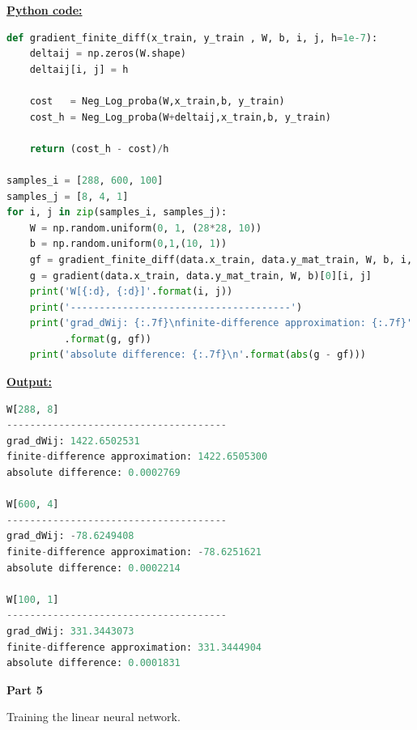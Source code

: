 \documentclass{article}
\begin{document}
\noindent \underline{\textbf{Python code:}} \\
\begin{biomathy}
\begin{lstlisting}[language=python ]
def gradient_finite_diff(x_train, y_train , W, b, i, j, h=1e-7):
    deltaij = np.zeros(W.shape)
    deltaij[i, j] = h

    cost   = Neg_Log_proba(W,x_train,b, y_train)
    cost_h = Neg_Log_proba(W+deltaij,x_train,b, y_train)

    return (cost_h - cost)/h

samples_i = [288, 600, 100]
samples_j = [8, 4, 1]
for i, j in zip(samples_i, samples_j):
    W = np.random.uniform(0, 1, (28*28, 10))
    b = np.random.uniform(0,1,(10, 1))
    gf = gradient_finite_diff(data.x_train, data.y_mat_train, W, b, i, j)
    g = gradient(data.x_train, data.y_mat_train, W, b)[0][i, j]
    print('W[{:d}, {:d}]'.format(i, j))
    print('--------------------------------------')
    print('grad_dWij: {:.7f}\nfinite-difference approximation: {:.7f}'
          .format(g, gf))
    print('absolute difference: {:.7f}\n'.format(abs(g - gf)))
\end{lstlisting}
\end{biomathy}
\pagebreak
\noindent \underline{\textbf{Output:}} \\


\begin{biomathc}
\begin{lstlisting}[language=python]
W[288, 8]
--------------------------------------
grad_dWij: 1422.6502531
finite-difference approximation: 1422.6505300
absolute difference: 0.0002769

W[600, 4]
--------------------------------------
grad_dWij: -78.6249408
finite-difference approximation: -78.6251621
absolute difference: 0.0002214

W[100, 1]
--------------------------------------
grad_dWij: 331.3443073
finite-difference approximation: 331.3444904
absolute difference: 0.0001831
\end{lstlisting}
\end{biomathc}


\pagebreak
\begin{center}
\textbf{Part 5 }
\end{center}

\begin{biomathg}
Training the linear neural network.
\end{biomathg}
\end{document}
